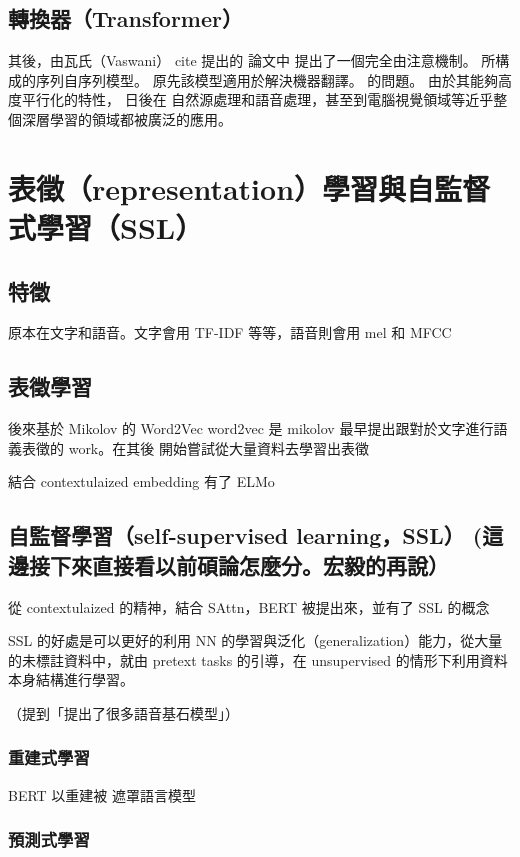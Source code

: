 \subsection{轉換器（Transformer）}

其後，由瓦氏（Vaswani） cite 提出的 論文中 提出了一個完全由注意機制。 所構成的序列自序列模型。 原先該模型適用於解決機器翻譯。 的問題。
由於其能夠高度平行化的特性， 日後在 自然源處理和語音處理，甚至到電腦視覺領域等近乎整個深層學習的領域都被廣泛的應用。  

\section{表徵（representation）學習與自監督式學習（SSL）}

\subsection{特徵}

原本在文字和語音。文字會用 TF-IDF 等等，語音則會用 mel 和 MFCC

\subsection{表徵學習}

後來基於 Mikolov 的 Word2Vec
word2vec 是 mikolov \CITEME 最早提出跟對於文字進行語義表徵的 work。在其後
開始嘗試從大量資料去學習出表徵

結合 contextulaized embedding 有了 ELMo

\subsection{自監督學習（self-supervised learning，SSL） (這邊接下來直接看以前碩論怎麼分。宏毅的再說）}

從 contextulaized 的精神，結合 SAttn，BERT 被提出來，並有了 SSL 的概念

SSL 的好處是可以更好的利用 NN 的學習與泛化（generalization）能力，從大量的未標註資料中，就由 pretext tasks 的引導，在 unsupervised 的情形下利用資料本身結構進行學習。

（提到「提出了很多語音基石模型」）

\subsubsection{重建式學習}

BERT
以重建被
遮罩語言模型

\subsubsection{預測式學習}

